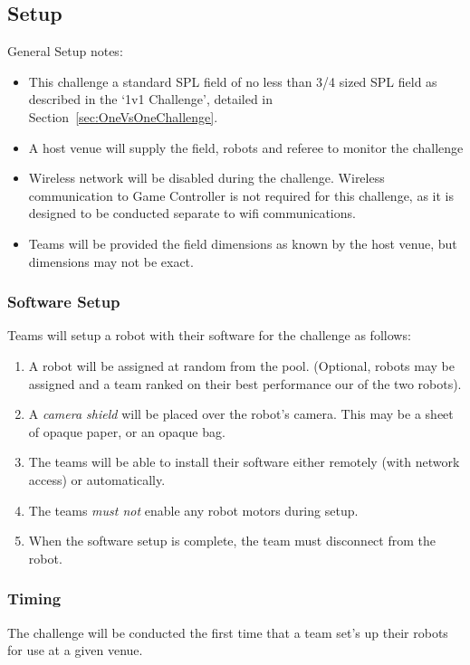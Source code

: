 \subsection{Setup}

General Setup notes:
\begin{itemize}
    \item This challenge a standard SPL field of no less than 3/4 sized SPL field as described in the `1v1 Challenge', detailed in Section~\ref{sec:OneVsOneChallenge}.
    \item  A host venue will supply the field, robots and referee to monitor the challenge
    \item  Wireless network will be disabled during the challenge. Wireless communication to Game Controller is not required for this challenge, as it is designed to be conducted separate to wifi communications. 
    \item Teams will be provided the field dimensions as known by the host venue, but dimensions may not be exact.
\end{itemize}

\subsubsection{Software Setup}

Teams will setup a robot with their software for the challenge as follows:
\begin{enumerate}
    \item A robot will be assigned at random from the pool. (Optional,  robots may be assigned and a team ranked on their best performance our of the two robots).
    \item A \textit{camera shield} will be placed over the robot's camera. This may be a sheet of opaque paper, or an opaque bag.
    \item The teams will be able to install their software either remotely (with network access) or automatically.
    \item The teams \textit{must not} enable any robot motors during setup.
    \item When the software setup is complete, the team must disconnect from the robot.
\end{enumerate} 

\subsubsection{Timing}
The challenge will be conducted the first time that a team set's up their robots for use at a given venue.

